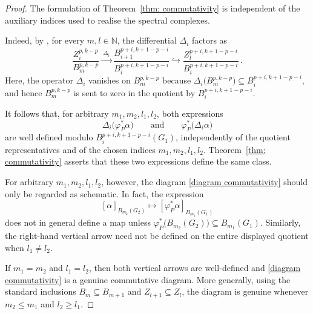 \documentclass[dvipsnames]{amsart}
\theoremstyle{definition}
\theoremstyle{definition}
\numberwithin{equation}{section}
\begin{document}
\begin{proof}
\label{rem:arbitrary-indices-commutativity} The formulation of Theorem~\ref{thm: commutativity} is independent of
the auxiliary indices used to realise the spectral complexes.

Indeed, by
\cite[Proposition 4.2]{tripaldi2026spectralcomplexestruncatedmulticomplexes},
for every \(m,l\in\mathbb N\), the differential \(\Delta_i\) factors
as
\[
\frac{Z_i^{p,k-p}}{B_m^{p,k-p}}
\xrightarrow{\ \Delta_i\ }
\frac{B_{i+1}^{p+i,k+1-p-i}}
     {B_i^{p+i,k+1-p-i}}
\hookrightarrow
\frac{Z_l^{p+i,k+1-p-i}}
     {B_i^{p+i,k+1-p-i}}\,.
\]
Here, the operator \(\Delta_i\) vanishes on \(B_m^{p,k-p}\)
because $\Delta_i\bigl(B_m^{p,k-p}\bigr)
\subseteq
B_i^{p+i,k+1-p-i}$,
and hence \(B_m^{p,k-p}\) is sent to zero in the quotient by
\(B_i^{p+i,k+1-p-i}\).

It follows that, for arbitrary \(m_1,m_2,l_1,l_2\), both expressions
\[
\Delta_i\bigl(\varphi_P^*\alpha\bigr)
\qquad\text{and}\qquad
\varphi_P^*\bigl(\Delta_i\alpha\bigr)
\]
are well defined modulo
\(B_i^{p+i,k+1-p-i}(G_1)\), independently of the quotient
representatives and of the chosen indices \(m_1,m_2,l_1,l_2\).
Theorem~\ref{thm: commutativity} asserts that these two expressions
define the same class.

For arbitrary \(m_1,m_2,l_1,l_2\), however, the diagram
\eqref{diagram commutativity} should only be regarded as schematic.
In fact, the expression
\[
[\alpha]_{B_{m_2}(G_2)}
\longmapsto
[\varphi_P^*\alpha]_{B_{m_1}(G_1)}
\]
does not in general define a map unless $\varphi_P^*\bigl(B_{m_2}(G_2)\bigr)
\subseteq
B_{m_1}(G_1)$.
Similarly, the right-hand vertical arrow need not be defined on the
entire displayed quotient when \(l_1\neq l_2\).

If \(m_1=m_2\) and \(l_1=l_2\), then both vertical arrows are
well-defined and \eqref{diagram commutativity} is a genuine
commutative diagram. More generally, using the standard inclusions $B_m\subseteq B_{m+1}$ and 
$Z_{l+1}\subseteq Z_l$,
the diagram is genuine whenever $m_2\leq m_1$ and $l_2\geq l_1$.


\end{proof}
\end{document}
